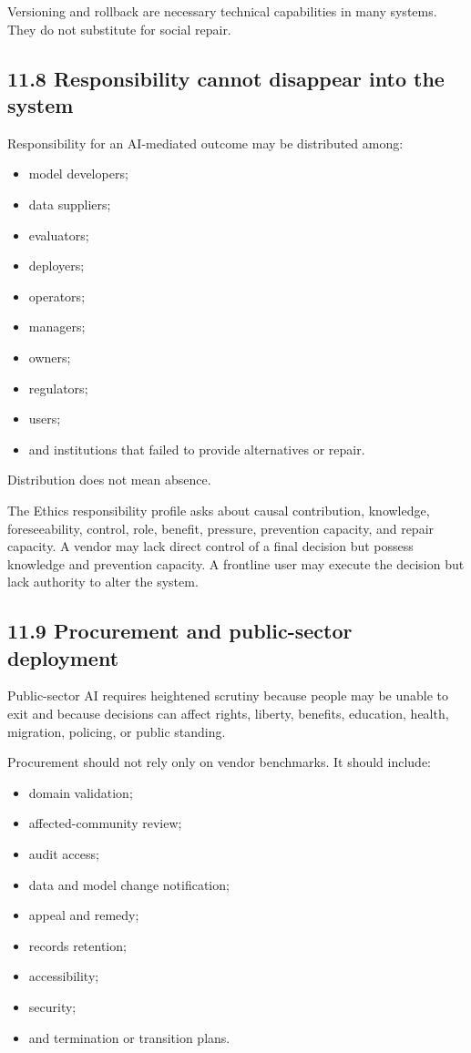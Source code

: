 \documentclass[
  11pt,
]{article}
\providecommand{\tightlist}{%
  \setlength{\itemsep}{0pt}\setlength{\parskip}{0pt}}
\begin{document}
Versioning and rollback are necessary technical capabilities in many
systems. They do not substitute for social repair.

\subsection{11.8 Responsibility cannot disappear into the
system}\label{responsibility-cannot-disappear-into-the-system}

Responsibility for an AI-mediated outcome may be distributed among:

\begin{itemize}
\tightlist
\item
  model developers;
\item
  data suppliers;
\item
  evaluators;
\item
  deployers;
\item
  operators;
\item
  managers;
\item
  owners;
\item
  regulators;
\item
  users;
\item
  and institutions that failed to provide alternatives or repair.
\end{itemize}

Distribution does not mean absence.

The Ethics responsibility profile asks about causal contribution,
knowledge, foreseeability, control, role, benefit, pressure, prevention
capacity, and repair capacity. A vendor may lack direct control of a
final decision but possess knowledge and prevention capacity. A
frontline user may execute the decision but lack authority to alter the
system.

\subsection{11.9 Procurement and public-sector
deployment}\label{procurement-and-public-sector-deployment}

Public-sector AI requires heightened scrutiny because people may be
unable to exit and because decisions can affect rights, liberty,
benefits, education, health, migration, policing, or public standing.

Procurement should not rely only on vendor benchmarks. It should
include:

\begin{itemize}
\tightlist
\item
  domain validation;
\item
  affected-community review;
\item
  audit access;
\item
  data and model change notification;
\item
  appeal and remedy;
\item
  records retention;
\item
  accessibility;
\item
  security;
\item
  and termination or transition plans.
\end{itemize}
\end{document}
